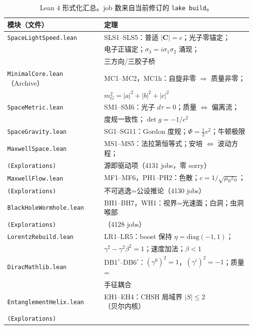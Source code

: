\documentclass[aps,prd,preprint,superscriptaddress,amsmath,amssymb]{revtex4-2}
\begin{document}
\begin{table}[h]
\caption{Lean 4 形式化汇总。job 数来自当前修订的 \texttt{lake build}。}
\label{tab:lean}
\begin{ruledtabular}
\begin{tabular}{ll}
模块（文件） & 定理 \\
\hline
\texttt{SpaceLightSpeed.lean} & SLS1--SLS5：普适 $|\bm{C}|=c$；光子零锚定； \\
 & 电子正锚定；$\sigma_3=i\sigma_1\sigma_2$ 涌现； \\
 & 三方向/三胶子桥 \\
\texttt{MinimalCore.lean}（Archive） & MC1--MC2，MC1h：自旋非零 $\Rightarrow$ 质量非零； \\
 & $m_G^2=|a|^2+|b|^2+|c|^2$ \\
\texttt{SpaceMetric.lean} & SM1--SM6：光子 $d\tau=0$；质量 $\Leftrightarrow$ 偏离流； \\
 & 度规一致性；$\det g=-1/c^2$ \\
\texttt{SpaceGravity.lean} & SG1--SG11：Gordon 度规；$\Phi=\frac12 v^2$；牛顿极限 \\
\texttt{MaxwellSpace.lean} & MS1--MS5：法拉第恒等式；安培 $\Leftrightarrow$ 波动方程； \\
\texttt{(Explorations)} & 源即驱动项（4131 jobs，零 sorry） \\
\texttt{MaxwellFlow.lean} & MF1--MF6，PH1--PH2：色散；$c=1/\sqrt{\mu_0\varepsilon_0}$； \\
\texttt{(Explorations)} & 不可逃逸=公设推论（4130 jobs） \\
\texttt{BlackHoleWormhole.lean} & BH1--BH7，WH1：视界=光速面；白洞；虫洞喉部 \\
\texttt{(Explorations)} & （4128 jobs） \\
\texttt{LorentzRebuild.lean} & LR1--LR5：boost 保持 $\eta=\mathrm{diag}(-1,1)$； \\
 & $\gamma^2-\gamma^2\beta^2=1$；速度加法；$\beta<1$ \\
\texttt{DiracMathlib.lean} & DB1$'$--DB6$'$：$(\gamma^0)^2=1$，$(\gamma^i)^2=-1$；质量= \\
 & 手征耦合 \\
\texttt{EntanglementHelix.lean} & EH1--EH4：CHSH 局域界 $|S|\leq2$（贝尔内核） \\
\texttt{(Explorations)} & \\
\end{tabular}
\end{ruledtabular}
\end{table}
\end{document}
